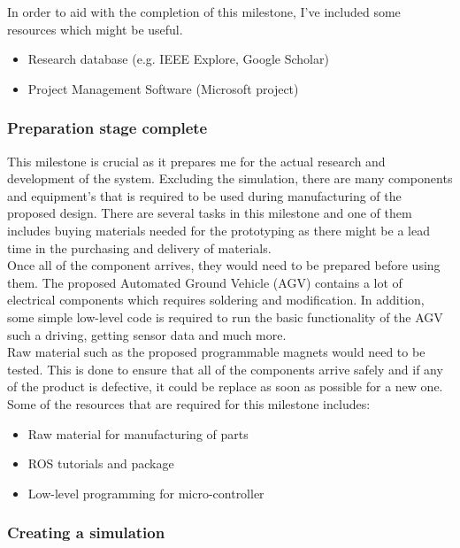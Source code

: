 \documentclass[12pt,A4]{article}
\begin{document}
	In order to aid with the completion of this milestone, I've included some resources which might be useful.
	
	\begin{itemize}
		\item Research database (e.g. IEEE Explore, Google Scholar)
		\item Project Management Software (Microsoft project)
	\end{itemize}
	
	\subsubsection{Preparation stage complete}
	
	This milestone is crucial as it prepares me for the actual research and development of the system. Excluding the simulation, there are many components and equipment's that is required to be used during manufacturing of the proposed design. There are several tasks in this milestone and one of them includes buying materials needed for the prototyping as there might be a lead time in the purchasing and delivery of materials.\\
	
	Once all of the component arrives, they would need to be prepared before using them. The proposed Automated Ground Vehicle (AGV) contains a lot of electrical components which requires soldering and modification. In addition, some simple low-level code is required to run the basic functionality of the AGV such a driving, getting sensor data and much more.\\
	
	Raw material such as the proposed programmable magnets would need to be tested. This is done to ensure that all of the components arrive safely and if any of the product is defective, it could be replace as soon as possible for a new one.\\
	
	Some of the resources that are required for this milestone includes:
	\begin{itemize}
		\item Raw material for manufacturing of parts
		\item ROS tutorials and package
		\item Low-level programming for micro-controller
	\end{itemize}
	
	\subsubsection{Creating a simulation}
	
\end{document}
